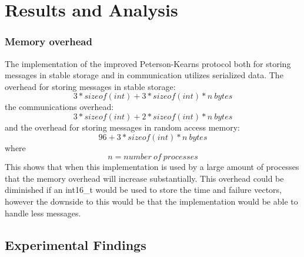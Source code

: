 \documentclass[twocolumn, a4paper,11pt]{article}%
\begin{document}
\section{Results and Analysis}
\subsubsection{Memory overhead}
\par The implementation of the improved Peterson-Kearns protocol both for storing messages in stable storage and in communication utilizes serialized data. The overhead for storing messages in stable storage:\[3*sizeof(int) + 3*sizeof(int)*n\ bytes\]the communications overhead:\[ 3*sizeof(int) + 2*sizeof(int)*n\ bytes\]and the overhead for storing messages in random access memory: \[96+3*sizeof(int)*n\ bytes\] where \[n = number\ of\ processes\] 
This shows that when this implementation is used by a large amount of processes that the memory overhead will increase substantially. This overhead could be diminished if an int16\_t would be used to store the time and failure vectors, however the downside to this would be that the implementation would be able to handle less messages.

\subsection{Experimental Findings}
\end{document}
